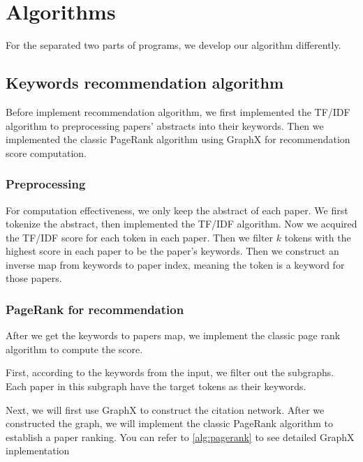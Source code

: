 \section{Algorithms} \label{sec:algo}

For the separated two parts of programs, we develop our algorithm differently. 

\subsection{Keywords recommendation algorithm}

Before implement recommendation algorithm, we first implemented the TF/IDF algorithm to preprocessing papers' abstracts into their keywords. Then we implemented the classic PageRank algorithm using GraphX for recommendation score computation.

\subsubsection{Preprocessing}

For computation effectiveness, we only keep the abstract of each paper. We first tokenize the abstract, then implemented the TF/IDF algorithm. Now we acquired the TF/IDF score for each token in each paper. Then we filter $k$ tokens with the highest score in each paper to be the paper's keywords. Then we construct an inverse map from keywords to paper index, meaning the token is a keyword for those papers. 

\subsubsection{PageRank for recommendation}

After we get the keywords to papers map, we implement the classic page rank algorithm to compute the score.

First, according to the keywords from the input, we filter out the subgraphs. Each paper in this subgraph have the target tokens as their keywords. 

Next, we will first use GraphX to construct the citation network.  After we constructed the graph, we will implement the classic PageRank algorithm to establish a paper ranking. You can refer to \ref{alg:pagerank} to see detailed GraphX inplementation

